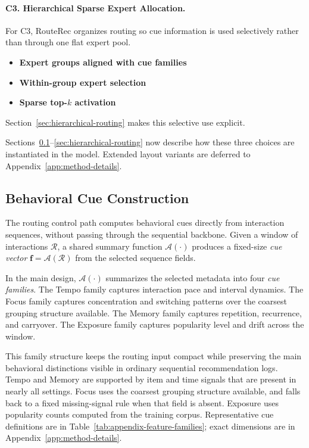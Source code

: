 \documentclass[sigconf,review,anonymous]{acmart}
\begin{document}
\paragraph{\textbf{C3. Hierarchical Sparse Expert Allocation.}}
For C3, RouteRec organizes routing so cue information is used selectively rather than through one flat expert pool.
\begin{itemize}
  \item \textbf{Expert groups aligned with cue families}
  \item \textbf{Within-group expert selection}
  \item \textbf{Sparse top-$k$ activation}
\end{itemize}
Section~\ref{sec:hierarchical-routing} makes this selective use explicit.

Sections~\ref{sec:feature-construction}--\ref{sec:hierarchical-routing} now describe how these three choices are instantiated in the model. Extended layout variants are deferred to Appendix~\ref{app:method-details}.


\subsection{Behavioral Cue Construction}
\label{sec:feature-construction}

The routing control path computes behavioral cues directly from interaction sequences, without passing through the sequential backbone. Given a window of interactions $\mathcal{R}$, a shared summary function $\mathcal{A}(\cdot)$ produces a fixed-size \emph{cue vector} $\mathbf{f} = \mathcal{A}(\mathcal{R})$ from the selected sequence fields.

In the main design, $\mathcal{A}(\cdot)$ summarizes the selected metadata into four \emph{cue families}. The Tempo family captures interaction pace and interval dynamics. The Focus family captures concentration and switching patterns over the coarsest grouping structure available. The Memory family captures repetition, recurrence, and carryover. The Exposure family captures popularity level and drift across the window.

This family structure keeps the routing input compact while preserving the main behavioral distinctions visible in ordinary sequential recommendation logs. Tempo and Memory are supported by item and time signals that are present in nearly all settings. Focus uses the coarsest grouping structure available, and falls back to a fixed missing-signal rule when that field is absent. Exposure uses popularity counts computed from the training corpus. Representative cue definitions are in Table~\ref{tab:appendix-feature-families}; exact dimensions are in Appendix~\ref{app:method-details}.
\end{document}
